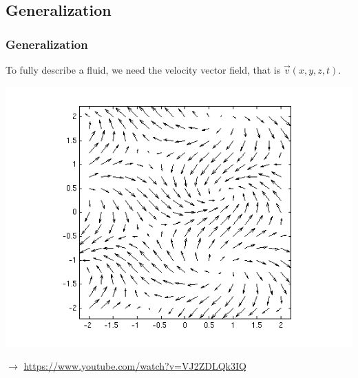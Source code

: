 \documentclass[]{beamer}
\begin{document}
\subsection{Generalization}
\begin{frame}

\frametitle{Generalization}


To fully describe a fluid, we need the velocity vector field, that is  $\vec{v}(x,y,z,t)$.

  \begin{center}
  \includegraphics[height=2.in]{images2/vectorial.png}
\end{center}


$\rightarrow$ \url{https://www.youtube.com/watch?v=VJ2ZDLQk3IQ} 

 \end{frame}


\end{document}

